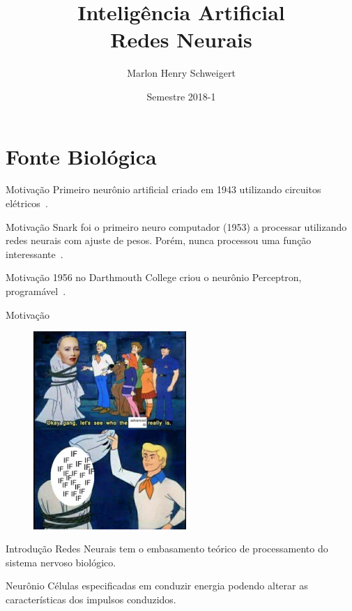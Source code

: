 \documentclass[compress]{beamer}
\title{Inteligência Artificial\\Redes Neurais}
\author{Marlon Henry Schweigert}
\date{Semestre 2018-1}
\begin{document}
\frame{\titlepage}


\section{Fonte Biológica}

\begin{frame}{Motivação}
    Primeiro neurônio artificial criado em 1943 utilizando circuitos elétricos~\cite{Yadav2015}.
\end{frame}

\begin{frame}{Motivação}
    Snark foi o primeiro neuro computador (1953) a processar utilizando redes neurais com ajuste de pesos. Porém, nunca processou uma função interessante~\cite{Yadav2015}.
\end{frame}

\begin{frame}{Motivação}
    1956 no Darthmouth College criou o neurônio Perceptron, programável~\cite{Yadav2015}.
\end{frame}

\begin{frame}{Motivação}
    \begin{figure}[h]
        \includegraphics[height=7.5cm]{img/if.jpeg}
    \end{figure}
\end{frame}

\begin{frame}{Introdução}
    Redes Neurais tem o embasamento teórico de processamento do sistema nervoso biológico.
\end{frame}

\begin{frame}{Neurônio}
    Células especificadas em conduzir energia podendo alterar as características dos impulsos conduzidos\cite{Netter2015}.
\end{frame}
\end{document}
